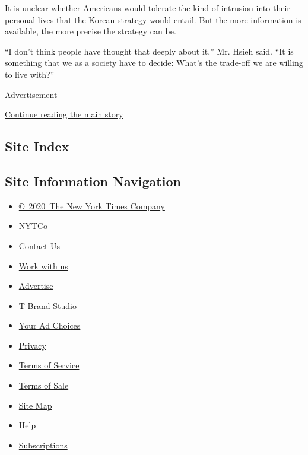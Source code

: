 It is unclear whether Americans would tolerate the kind of intrusion
into their personal lives that the Korean strategy would entail. But the
more information is available, the more precise the strategy can be.

``I don't think people have thought that deeply about it,'' Mr. Hsieh
said. ``It is something that we as a society have to decide: What's the
trade-off we are willing to live with?''

Advertisement

\protect\hyperlink{after-bottom}{Continue reading the main story}

\hypertarget{site-index}{%
\subsection{Site Index}\label{site-index}}

\hypertarget{site-information-navigation}{%
\subsection{Site Information
Navigation}\label{site-information-navigation}}

\begin{itemize}
\tightlist
\item
  \href{https://help.nytimes3xbfgragh.onion/hc/en-us/articles/115014792127-Copyright-notice}{©~2020~The
  New York Times Company}
\end{itemize}

\begin{itemize}
\tightlist
\item
  \href{https://www.nytco.com/}{NYTCo}
\item
  \href{https://help.nytimes3xbfgragh.onion/hc/en-us/articles/115015385887-Contact-Us}{Contact
  Us}
\item
  \href{https://www.nytco.com/careers/}{Work with us}
\item
  \href{https://nytmediakit.com/}{Advertise}
\item
  \href{http://www.tbrandstudio.com/}{T Brand Studio}
\item
  \href{https://www.nytimes3xbfgragh.onion/privacy/cookie-policy\#how-do-i-manage-trackers}{Your
  Ad Choices}
\item
  \href{https://www.nytimes3xbfgragh.onion/privacy}{Privacy}
\item
  \href{https://help.nytimes3xbfgragh.onion/hc/en-us/articles/115014893428-Terms-of-service}{Terms
  of Service}
\item
  \href{https://help.nytimes3xbfgragh.onion/hc/en-us/articles/115014893968-Terms-of-sale}{Terms
  of Sale}
\item
  \href{https://spiderbites.nytimes3xbfgragh.onion}{Site Map}
\item
  \href{https://help.nytimes3xbfgragh.onion/hc/en-us}{Help}
\item
  \href{https://www.nytimes3xbfgragh.onion/subscription?campaignId=37WXW}{Subscriptions}
\end{itemize}
